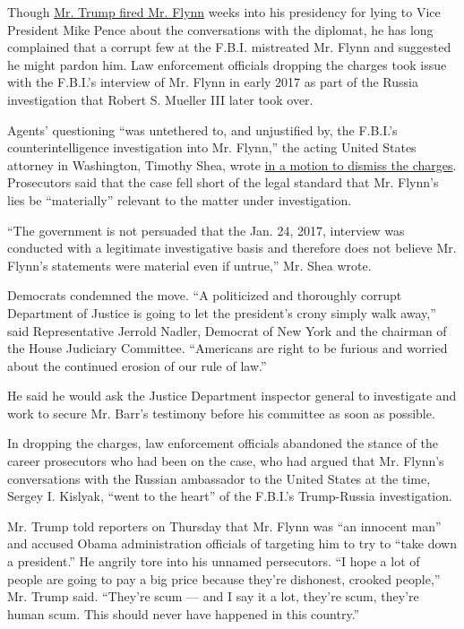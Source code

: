 Though
\href{https://www.nytimes.com/2017/02/13/us/politics/donald-trump-national-security-adviser-michael-flynn.html}{Mr.
Trump fired Mr. Flynn} weeks into his presidency for lying to Vice
President Mike Pence about the conversations with the diplomat, he has
long complained that a corrupt few at the F.B.I. mistreated Mr. Flynn
and suggested he might pardon him. Law enforcement officials dropping
the charges took issue with the F.B.I.'s interview of Mr. Flynn in early
2017 as part of the Russia investigation that Robert S. Mueller III
later took over.

Agents' questioning ``was untethered to, and unjustified by, the
F.B.I.'s counterintelligence investigation into Mr. Flynn,'' the acting
United States attorney in Washington, Timothy Shea, wrote
\href{https://int.nyt.com/data/documenthelper/6936-michael-flynn-motion-to-dismiss/fa06f5e13a0ec71843b6/optimized/full.pdf\#page=1}{in
a motion to dismiss the charges}. Prosecutors said that the case fell
short of the legal standard that Mr. Flynn's lies be ``materially''
relevant to the matter under investigation.

``The government is not persuaded that the Jan. 24, 2017, interview was
conducted with a legitimate investigative basis and therefore does not
believe Mr. Flynn's statements were material even if untrue,'' Mr. Shea
wrote.

Democrats condemned the move. ``A politicized and thoroughly corrupt
Department of Justice is going to let the president's crony simply walk
away,'' said Representative Jerrold Nadler, Democrat of New York and the
chairman of the House Judiciary Committee. ``Americans are right to be
furious and worried about the continued erosion of our rule of law.''

He said he would ask the Justice Department inspector general to
investigate and work to secure Mr. Barr's testimony before his committee
as soon as possible.

In dropping the charges, law enforcement officials abandoned the stance
of the career prosecutors who had been on the case, who had argued that
Mr. Flynn's conversations with the Russian ambassador to the United
States at the time, Sergey I. Kislyak, ``went to the heart'' of the
F.B.I.'s Trump-Russia investigation.

Mr. Trump told reporters on Thursday that Mr. Flynn was ``an innocent
man'' and accused Obama administration officials of targeting him to try
to ``take down a president.'' He angrily tore into his unnamed
persecutors. ``I hope a lot of people are going to pay a big price
because they're dishonest, crooked people,'' Mr. Trump said. ``They're
scum --- and I say it a lot, they're scum, they're human scum. This
should never have happened in this country.''

